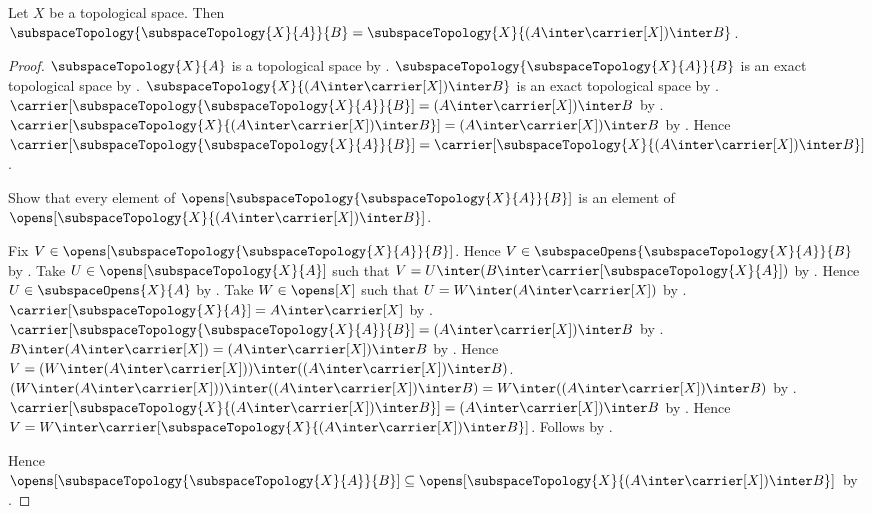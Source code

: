 \begin{theorem}\label{subspace_topology_transitive}
    Let $X$ be a topological space.
    Then $\subspaceTopology{\subspaceTopology{X}{A}}{B}
        =\subspaceTopology{X}{(A\inter\carrier[X])\inter B}$.
\end{theorem}
\begin{proof}
    $\subspaceTopology{X}{A}$ is a topological space by
        .
    $\subspaceTopology{\subspaceTopology{X}{A}}{B}$ is an exact
        topological space by .
    $\subspaceTopology{X}{(A\inter\carrier[X])\inter B}$ is an exact
        topological space by .
    $\carrier[\subspaceTopology{\subspaceTopology{X}{A}}{B}]
        =(A\inter\carrier[X])\inter B$ by
        .
    $\carrier[\subspaceTopology{X}{(A\inter\carrier[X])\inter B}]
        =(A\inter\carrier[X])\inter B$ by
        .
    Hence $\carrier[\subspaceTopology{\subspaceTopology{X}{A}}{B}]
        =\carrier[\subspaceTopology{X}{(A\inter\carrier[X])\inter B}]$.

    Show that every element of
        $\opens[\subspaceTopology{\subspaceTopology{X}{A}}{B}]$
        is an element of
        $\opens[\subspaceTopology{X}{(A\inter\carrier[X])\inter B}]$.
    \begin{subproof}
        Fix $V\in
            \opens[\subspaceTopology{\subspaceTopology{X}{A}}{B}]$.
        Hence $V\in
            \subspaceOpens{\subspaceTopology{X}{A}}{B}$ by
            .
        Take $U\in\opens[\subspaceTopology{X}{A}]$ such that
            $V=U\inter(B\inter\carrier[\subspaceTopology{X}{A}])$ by
            .
        Hence $U\in\subspaceOpens{X}{A}$ by
            .
        Take $W\in\opens[X]$ such that
            $U=W\inter(A\inter\carrier[X])$ by
            .
        $\carrier[\subspaceTopology{X}{A}]=A\inter\carrier[X]$ by
            .
        $\carrier[\subspaceTopology{\subspaceTopology{X}{A}}{B}]
            =(A\inter\carrier[X])\inter B$ by
            .
        $B\inter(A\inter\carrier[X])
            =(A\inter\carrier[X])\inter B$ by .
        Hence $V=(W\inter(A\inter\carrier[X]))
            \inter((A\inter\carrier[X])\inter B)$.
        $(W\inter(A\inter\carrier[X]))
            \inter((A\inter\carrier[X])\inter B)
            =W\inter((A\inter\carrier[X])\inter B)$ by
            .
        $\carrier[\subspaceTopology{X}{(A\inter\carrier[X])\inter B}]
            =(A\inter\carrier[X])\inter B$ by
            .
        Hence $V=W\inter
            \carrier[\subspaceTopology{X}{(A\inter\carrier[X])\inter B}]$.
        Follows by .
    \end{subproof}
    Hence $\opens[\subspaceTopology{\subspaceTopology{X}{A}}{B}]
        \subseteq
        \opens[\subspaceTopology{X}{(A\inter\carrier[X])\inter B}]$ by
        .


\end{proof}
